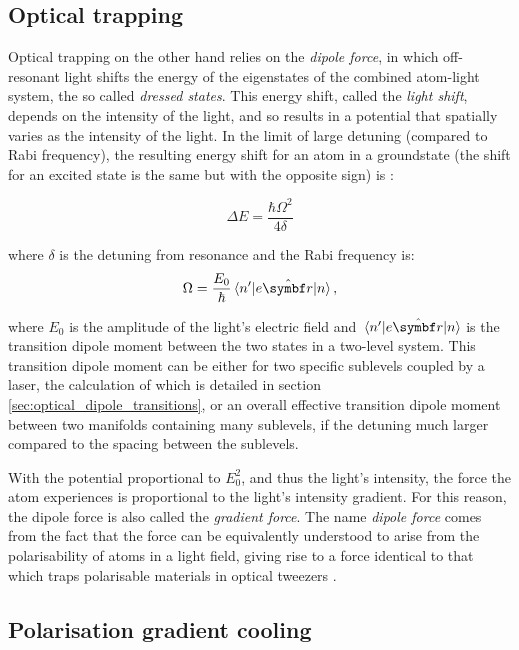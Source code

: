 \subsection{Optical trapping}

Optical trapping on the other hand relies on the \emph{dipole force}, in which off-resonant light shifts the energy of the eigenstates of the combined atom-light system, the so called \emph{dressed states}. This energy shift, called the \emph{light shift}, depends on the intensity of the light, and so results in a potential that spatially varies as the intensity of the light. In the limit of large detuning (compared to Rabi frequency), the resulting energy shift for an atom in a groundstate (the shift for an excited state is the same but with the opposite sign) is \cite[p 8]{metcalf_laser_1999}:

\begin{equation}
\Delta E = \frac{\hbar\Omega^2}{4\delta}
\end{equation}

where $\delta$ is the detuning from resonance and the Rabi frequency is:
\begin{equation}
\Omega=\frac{E_0}\hbar\matrixel{n^\prime}{e\hat{\vec r}}{n},
\end{equation}

where $E_0$ is the amplitude of the light's electric field and  $\matrixel{n^\prime}{e\hat{\vec r}}{n}$ is the transition dipole moment between the two states in a two-level system. This transition dipole moment can be either for two specific sublevels coupled by a laser, the calculation of which is detailed in section \ref{sec:optical_dipole_transitions}, or an overall effective transition dipole moment between two manifolds containing many sublevels, if the detuning much larger compared to the spacing between the sublevels.

With the potential proportional to $E_0^2$, and thus the light's intensity, the force the atom experiences is proportional to the light's intensity gradient. For this reason, the dipole force is also called the \emph{gradient force}. The name \emph{dipole force} comes from the fact that the force can be equivalently understood to arise from the polarisability of atoms in a light field, giving rise to a force identical to that which traps polarisable materials in optical tweezers \cite{ashkin_acceleration_1970}.

\subsection{Polarisation gradient cooling}


